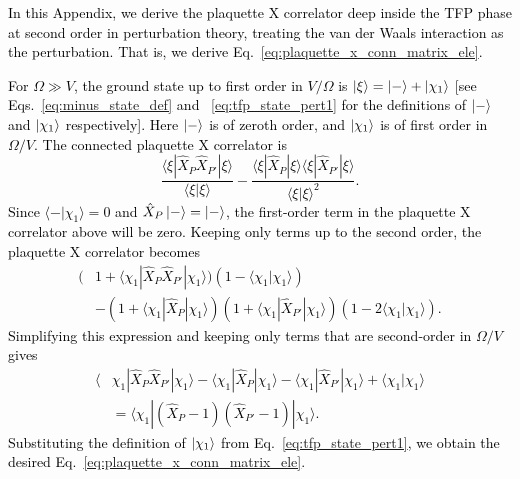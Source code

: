 \documentclass[twocolumn,superscriptaddress,amsmath,amssymb,aps,prx,nofootinbib]{revtex4-2}
\newcommand{\newtext}[1]{\textcolor{black}{#1}}
\begin{document}
\newtext{In this Appendix, we derive  the plaquette X correlator deep inside the TFP phase at second order in perturbation theory, treating the van der Waals interaction as the perturbation. That is, we derive Eq.~\eqref{eq:plaquette_x_conn_matrix_ele}. }

\newtext{For $\Omega \gg V$, the ground state up to  first order in $V/\Omega$ is $\ket{\xi} = \ket{-} +\ket{\chi_1} $ [see Eqs.~\eqref{eq:minus_state_def} and ~\eqref{eq:tfp_state_pert1} for the definitions of $\ket{-}$ and $\ket{\chi_1}$ respectively]. Here $\ket{-}$ is of zeroth order, and $\ket{\chi_1}$ is of first order in $\Omega/V$.  The connected plaquette X correlator is
\begin{equation}
    \frac{\langle \xi | \hat{X}_P \hat{X}_{P'}| \xi \rangle}{\langle \xi | \xi \rangle} -    \frac{\langle \xi | \hat{X}_P | \xi \rangle\langle \xi | \hat{X}_{P'} | \xi \rangle}{\langle \xi | \xi \rangle^2}.    
\end{equation}
Since $\langle - | \chi_1 \rangle = 0$ and $\hat{X}_P \ket{-} = \ket{-}$, the first-order term in the plaquette X correlator above will be zero. Keeping only terms up to the second order, the plaquette X correlator becomes
\begin{equation}
\begin{aligned}
    (&1+\langle \chi_1 | \hat{X}_{P}\hat{X}_{P'} | \chi_1 \rangle )( 1- \langle \chi_1 | \chi_1 \rangle )\\
    & - (1+\langle \chi_1 | \hat{X}_P | \chi_1\rangle ) (1+\langle \chi_1 | \hat{X}_{P'} | \chi_1\rangle ) (1-2\langle \chi_1 | \chi_1\rangle ). 
    \end{aligned}
\end{equation}
Simplifying this expression and keeping only terms that are second-order in $\Omega/V$ gives
\begin{equation}
\begin{aligned}
    \langle &\chi_1 | \hat{X}_{P}\hat{X}_{P'} | \chi_1 \rangle - \langle \chi_1 | \hat{X}_{P}| \chi_1 \rangle - \langle \chi_1 | \hat{X}_{P'} | \chi_1 \rangle + \langle \chi_1 | \chi_1 \rangle\\
    &= \langle \chi_1 | (\hat{X}_P - 1) (\hat{X}_{P'} - 1) | \chi_1 \rangle.
\end{aligned}
\end{equation}
Substituting the definition of $\ket{\chi_1}$ from Eq.~\eqref{eq:tfp_state_pert1}, we obtain the desired Eq.~\eqref{eq:plaquette_x_conn_matrix_ele}.
}
\end{document}
